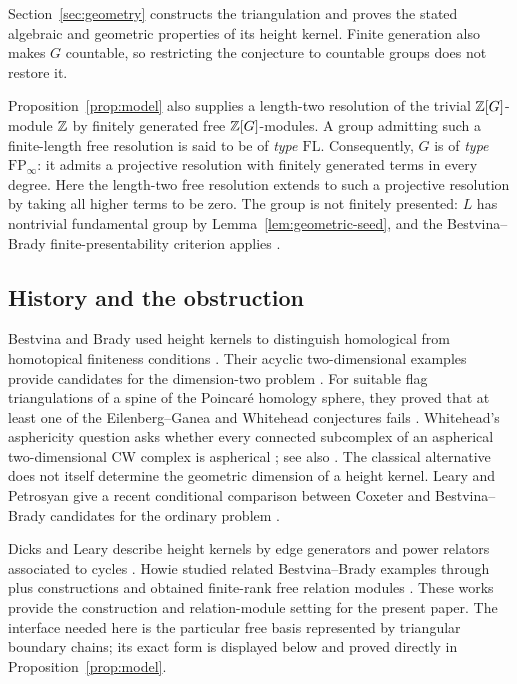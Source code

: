 Section~\ref{sec:geometry} constructs the triangulation and proves the stated algebraic and geometric properties of its height kernel. Finite generation also makes $G$ countable, so restricting the conjecture to countable groups does not restore it.

Proposition~\ref{prop:model} also supplies a length-two resolution of the trivial $\mathbb Z[G]$-module $\mathbb Z$ by finitely generated free $\mathbb Z[G]$-modules. A group admitting such a finite-length free resolution is said to be of \emph{type $\mathrm{FL}$}. Consequently, $G$ is of \emph{type $\mathrm{FP}_\infty$}: it admits a projective resolution with finitely generated terms in every degree. Here the length-two free resolution extends to such a projective resolution by taking all higher terms to be zero. The group is not finitely presented: $L$ has nontrivial fundamental group by Lemma~\ref{lem:geometric-seed}, and the Bestvina--Brady finite-presentability criterion applies \cite[Main Theorem, part~(3)]{BB1997}.

\subsection*{History and the obstruction}

Bestvina and Brady used height kernels to distinguish homological from homotopical finiteness conditions \cite[Main Theorem]{BB1997}. Their acyclic two-dimensional examples provide candidates for the dimension-two problem \cite[Example~6.3(3)]{BB1997}. For suitable flag triangulations of a spine of the Poincar\'e homology sphere, they proved that at least one of the Eilenberg--Ganea and Whitehead conjectures fails \cite[Theorem~8.7]{BB1997}. Whitehead's asphericity question asks whether every connected subcomplex of an aspherical two-dimensional CW complex is aspherical \cite{Whitehead1941}; see also \cite[Section~8]{BB1997}. The classical alternative does not itself determine the geometric dimension of a height kernel. Leary and Petrosyan give a recent conditional comparison between Coxeter and Bestvina--Brady candidates for the ordinary problem \cite[Section~5.6, Conjecture~5.20 and Corollary~5.21]{LP2026}.

Dicks and Leary describe height kernels by edge generators and power relators associated to cycles \cite[Theorem~1 and Proposition~2]{DicksLeary1999}. Howie studied related Bestvina--Brady examples through plus constructions and obtained finite-rank free relation modules \cite{Howie1999}. These works provide the construction and relation-module setting for the present paper. The interface needed here is the particular free basis represented by triangular boundary chains; its exact form is displayed below and proved directly in Proposition~\ref{prop:model}.

